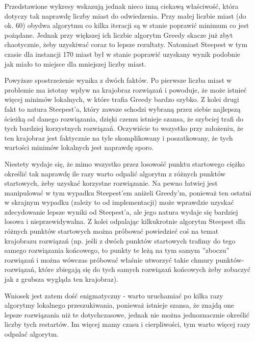 Przedstawione wykresy wskazują jednak nieco inną ciekawą właściwość, która dotyczy tak naprawdę liczby miast do odwiedzenia. Przy małej liczbie miast (do ok. 60) obydwa algorytmu co kilka iteracji są w stanie poprawić minimum co jest pożądane. Jednak przy większej ich liczbie algorytm Greedy skacze już zbyt chaotycznie, żeby uzyskiwać coraz to lepsze rezultaty. Natomiast Steepest w tym czasie dla instancji 170 miast był w stanie poprawić uzyskany wynik podobnie jak miało to miejsce dla mniejszej liczby miast.

Powyższe spostrzeżenie wynika z dwóch faktów. Po pierwsze liczba miast w problemie ma istotny wpływ na krajobraz rozwiązań i powoduje, że może istnieć więcej minimów lokalnych, w które trafia Greedy bardzo szybko. Z kolei drugi fakt to natura Steepest'a, który zawsze schodzi wybraną przez siebie najlepszą ścieżką od danego rozwiązania, dzięki czemu istnieje szansa, że szybciej trafi do tych bardziej korzystnych rozwiązań. Oczywiście to wszystko przy założeniu, że ten krajobraz jest faktycznie na tyle skomplikowany i poszatkowany, że tych wartości minimów lokalnych jest naprawdę sporo.

Niestety wydaje się, że mimo wszystko przez losowość punktu startowego ciężko określić tak naprawdę ile razy warto odpalić algorytm z różnych punktów startowych, żeby uzyskać korzystne rozwiązanie. Na pewno łatwiej jest manipulować w tym wypadku Steepest'em aniżeli Greedy'm, ponieważ ten ostatni w skrajnym wypadku (zależy to od implementacji) może wprawdzie uzyskać zdecydowanie lepsze wyniki od Steepest'a, ale jego natura wydaje się bardziej losowa i nieprzewidywalna. Z kolei odpalając kilkukrotnie algorytm Steepest dla różnych punktów startowych można próbować powiedzieć coś na temat krajobrazu rozwiązań (np. jeśli z dwóch punktów startowych trafimy do tego samego rozwiązania końcowego, to punkty te leżą na tym samym ''zboczu'' rozwiązań i można wówczas próbować właśnie utworzyć takie chmury punktów-rozwiązań, które zbiegają się do tych samych rozwiązań końcowych żeby zobaczyć jak z grubsza wygląda ten krajobraz).

Wniosek jest zatem dość enigmatyczny - warto uruchamiać po kilka razy algorytmy lokalnego przeszukiwania, ponieważ istnieje szansa, że znajdą one lepsze rozwiązania niż te dotychczasowe, jednak nie można jednoznacznie określić liczby tych restartów. Im więcej mamy czasu i cierpliwości, tym warto więcej razy odpalać algorytm.